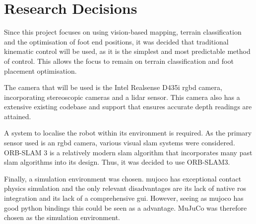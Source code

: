 \section{Research Decisions}
    Since this project focuses on using vision-based mapping, terrain classification and the optimisation of foot end positions, it was decided that traditional kinematic control will be used, as it is the simplest and most predictable method of control. This allows the focus to remain on terrain classification and foot placement optimisation.

    The camera that will be used is the Intel Realsense D435i \ac{rgbd} camera, incorporating stereoscopic cameras and a \ac{lidar} sensor. This camera also has a extensive existing codebase and support that ensures accurate depth readings are attained.

    A system to localise the robot within its environment is required. As the primary sensor used is an \ac{rgbd} camera, various visual \ac{slam} systems were considered. ORB-SLAM 3 is a relatively modern \ac{slam} algorithm that incorporates many past \ac{slam} algorithms into its design. Thus, it was decided to use ORB-SLAM3.

    Finally, a simulation environment was chosen. \ac{mujoco} has exceptional contact physics simulation and the only relevant disadvantages are its lack of native \ac{ros} integration and its lack of a comprehensive \ac{gui}. However, seeing as \ac{mujoco} has good python bindings this could be seen as a advantage. MuJuCo was therefore chosen as the simulation environment.